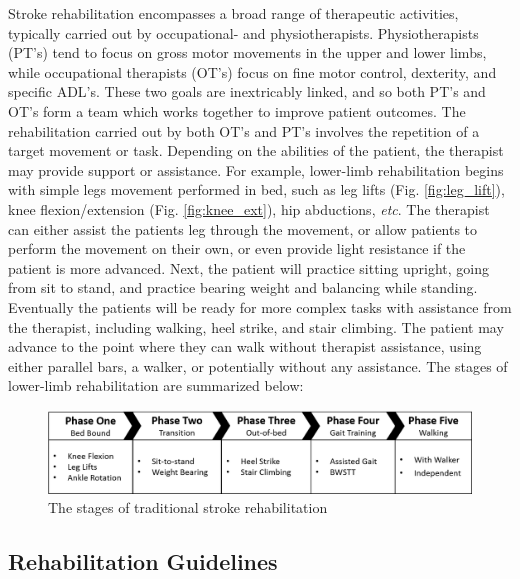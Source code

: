 \documentclass[12pt]{report}
\begin{document}
Stroke rehabilitation encompasses a broad range of therapeutic activities, typically carried out by occupational- and physiotherapists. Physiotherapists (PT's) tend to focus on gross motor movements in the upper and lower limbs, while occupational therapists (OT's) focus on fine motor control, dexterity, and specific ADL's. These two goals are inextricably linked, and so both PT's and OT's form a team which works together to improve patient outcomes. The rehabilitation carried out by both OT's and PT's involves the repetition of a target movement or task. Depending on the abilities of the patient, the therapist may provide support or assistance. For example, lower-limb rehabilitation begins with simple legs movement performed in bed, such as leg lifts (Fig. \ref{fig:leg_lift}), knee flexion/extension (Fig. \ref{fig:knee_ext}), hip abductions, \textit{etc}. The therapist can either assist the patients leg through the movement, or allow patients to perform the movement on their own, or even provide light resistance if the patient is more advanced. Next, the patient will practice sitting upright, going from sit to stand, and  practice bearing weight and balancing while standing. Eventually the patients will be ready for more complex tasks with assistance from the therapist, including walking, heel strike, and stair climbing. The patient may advance to the point where they can walk without therapist assistance, using either parallel bars, a walker, or potentially without any assistance. The stages of lower-limb rehabilitation are summarized below:


	\begin{figure}[h] 
		\centering
		\includegraphics[width=\linewidth]{Traditional_therapy}
		\caption{The stages of traditional stroke rehabilitation}
		\label{fig:stages}
	\end{figure}


\subsection{Rehabilitation Guidelines}
\end{document}

